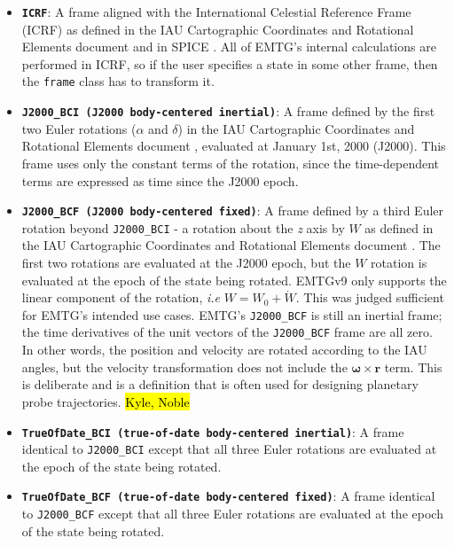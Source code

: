 \begin{itemize}
	\item \textbf{\texttt{ICRF}}: A frame aligned with the International Celestial Reference Frame (ICRF) as defined in the \ac{IAU} Cartographic Coordinates and Rotational Elements document \cite{IAU_cartographic_coordinates_2018} and in \ac{SPICE} \cite{SPICE}. All of EMTG's internal calculations are performed in ICRF, so if the user specifies a state in some other frame, then the \texttt{frame} class has to transform it.
	
	\item \textbf{\texttt{J2000\_BCI (J2000 body-centered inertial)}}: A frame defined by the first two Euler rotations ($\alpha$ and $\delta$) in the \ac{IAU} Cartographic Coordinates and Rotational Elements document \cite{IAU_cartographic_coordinates_2018}, evaluated at January 1st, 2000 (J2000). This frame uses only the constant terms of the rotation, since the time-dependent terms are expressed as time since the J2000 epoch.
	
	\item \textbf{\texttt{J2000\_BCF (J2000 body-centered fixed)}}: A frame defined by a third Euler rotation beyond \texttt{J2000\_BCI} - a rotation about the \textit{z} axis by $W$ as defined in the \ac{IAU} Cartographic Coordinates and Rotational Elements document \cite{IAU_cartographic_coordinates_2018}. The first two rotations are evaluated at the J2000 epoch, but the $W$ rotation is evaluated at the epoch of the state being rotated. EMTGv9 only supports the linear component of the rotation, \textit{i.e} $W = W_0 + \dot{W}$. This was judged sufficient for EMTG's intended use cases. EMTG's \texttt{J2000\_BCF} is still an inertial frame; the time derivatives of the unit vectors of the \texttt{J2000\_BCF} frame are all zero. In other words, the position and velocity are rotated according to the IAU angles, but the velocity transformation does not include the $\mathbf{\omega} \times \mathbf{r}$ term. This is deliberate and is a definition that is often used for designing planetary probe trajectories. \hl{Kyle, Noble}
	
	\item \textbf{\texttt{TrueOfDate\_BCI (true-of-date body-centered inertial)}}: A frame identical to \texttt{J2000\_BCI} except that all three Euler rotations are evaluated at the epoch of the state being rotated.
	
	\item \textbf{\texttt{TrueOfDate\_BCF (true-of-date body-centered fixed)}}: A frame identical to \texttt{J2000\_BCF} except that all three Euler rotations are evaluated at the epoch of the state being rotated.
	

\end{itemize}
